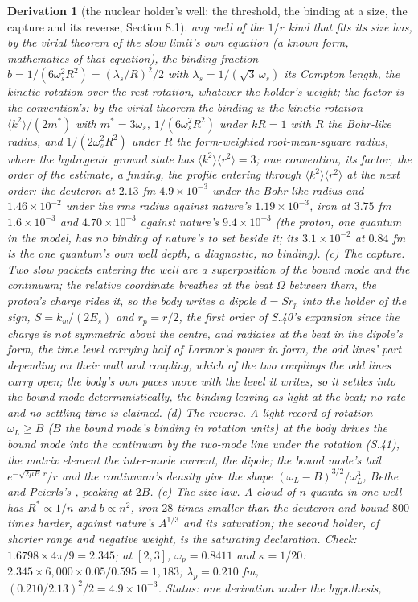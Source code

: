 \documentclass[pdflatex,sn-mathphys-num]{sn-jnl}
\theoremstyle{thmstyleone}
\newtheorem{derivation}{Derivation}
\begin{document}
\begin{derivation}[the nuclear holder's well: the threshold, the binding at a size, the capture and its reverse, Section 8.1]
any well of the $1 / r$ kind that fits its size has, by the virial theorem of the slow limit's own equation (a known form, mathematics of that equation), the binding fraction $b = 1 / (6\omega_s^2 R^2) = (\lambda_s / R)^2 / 2$ with $\lambda_s = 1 / (\sqrt 3\,\omega_s)$ its Compton length, the kinetic rotation over the rest rotation, whatever the holder's weight; the factor is the convention's: by the virial theorem the binding is the kinetic rotation $\langle k^2\rangle / (2m^*)$ with $m^* = 3\omega_s$, $1 / (6\omega_s^2 R^2)$ under $kR = 1$ with $R$ the Bohr-like radius, and $1 / (2\omega_s^2 R^2)$ under $R$ the form-weighted root-mean-square radius, where the hydrogenic ground state has $\langle k^2\rangle\langle r^2\rangle = 3$; one convention, its factor, the order of the estimate, a finding, the profile entering through $\langle k^2\rangle\langle r^2\rangle$ at the next order: the deuteron at $2.13$ fm $4.9 \times 10^{-3}$ under the Bohr-like radius and $1.46 \times 10^{-2}$ under the rms radius against nature's $1.19 \times 10^{-3}$, iron at $3.75$ fm $1.6 \times 10^{-3}$ and $4.70 \times 10^{-3}$ against nature's $9.4 \times 10^{-3}$ (the proton, one quantum in the model, has no binding of nature's to set beside it; its $3.1 \times 10^{-2}$ at $0.84$ fm is the one quantum's own well depth, a diagnostic, no binding). (c) \emph{The capture.} Two slow packets entering the well are a superposition of the bound mode and the continuum; the relative coordinate breathes at the beat $\Omega$ between them, the proton's charge rides it, so the body writes a dipole $d = S r_p$ into the holder of the sign, $S = k_w / (2E_s)$ and $r_p = r / 2$, the first order of S.40's expansion since the charge is not symmetric about the centre, and radiates at the beat in the dipole's form, the time level carrying half of Larmor's power in form, the odd lines' part depending on their wall and coupling, which of the two couplings the odd lines carry open; the body's own paces move with the level it writes, so it settles into the bound mode deterministically, the binding leaving as light at the beat; no rate and no settling time is claimed. (d) \emph{The reverse.} A light record of rotation $\omega_L \ge B$ ($B$ the bound mode's binding in rotation units) at the body drives the bound mode into the continuum by the two-mode line under the rotation (S.41), the matrix element the inter-mode current, the dipole; the bound mode's tail $e^{-\sqrt{2\mu B}\,r} / r$ and the continuum's density give the shape $(\omega_L - B)^{3/2} / \omega_L^3$, Bethe and Peierls's \cite{bethe_peierls}, peaking at $2B$. (e) \emph{The size law.} A cloud of $n$ quanta in one well has $R^* \propto 1 / n$ and $b \propto n^2$, iron $28$ times smaller than the deuteron and bound $800$ times harder, against nature's $A^{1/3}$ and its saturation; the second holder, of shorter range and negative weight, is the saturating declaration. \emph{Check:} $1.6798 \times 4\pi / 9 = 2.345$; at $[2, 3]$, $\omega_p = 0.8411$ and $\kappa = 1 / 20$: $2.345 \times 6{,}000 \times 0.05 / 0.595 = 1{,}183$; $\lambda_p = 0.210$ fm, $(0.210 / 2.13)^2 / 2 = 4.9 \times 10^{-3}$. \emph{Status:} one derivation under the hypothesis, 
\end{derivation}
\end{document}
